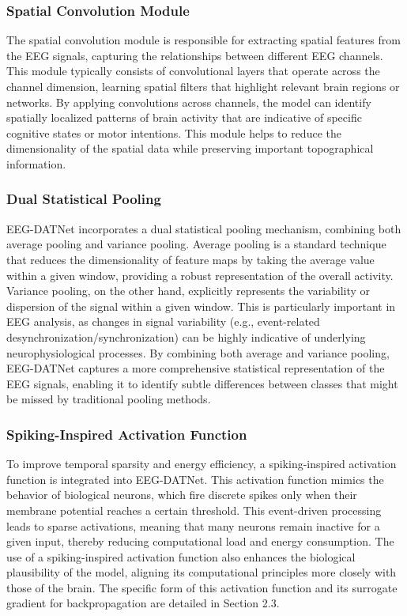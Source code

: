 \documentclass[pdflatex,sn-mathphys-num]{sn-jnl}
\theoremstyle{thmstyleone}%
\theoremstyle{thmstyletwo}%
\theoremstyle{thmstylethree}%
\begin{document}
\subsubsection{Spatial Convolution Module}

The spatial convolution module is responsible for extracting spatial features from the EEG signals, capturing the relationships between different EEG channels. This module typically consists of convolutional layers that operate across the channel dimension, learning spatial filters that highlight relevant brain regions or networks. By applying convolutions across channels, the model can identify spatially localized patterns of brain activity that are indicative of specific cognitive states or motor intentions. This module helps to reduce the dimensionality of the spatial data while preserving important topographical information.

\subsubsection{Dual Statistical Pooling}

EEG-DATNet incorporates a dual statistical pooling mechanism, combining both average pooling and variance pooling. Average pooling is a standard technique that reduces the dimensionality of feature maps by taking the average value within a given window, providing a robust representation of the overall activity. Variance pooling, on the other hand, explicitly represents the variability or dispersion of the signal within a given window. This is particularly important in EEG analysis, as changes in signal variability (e.g., event-related desynchronization/synchronization) can be highly indicative of underlying neurophysiological processes. By combining both average and variance pooling, EEG-DATNet captures a more comprehensive statistical representation of the EEG signals, enabling it to identify subtle differences between classes that might be missed by traditional pooling methods.

\subsubsection{Spiking-Inspired Activation Function}

To improve temporal sparsity and energy efficiency, a spiking-inspired activation function is integrated into EEG-DATNet. This activation function mimics the behavior of biological neurons, which fire discrete spikes only when their membrane potential reaches a certain threshold. This event-driven processing leads to sparse activations, meaning that many neurons remain inactive for a given input, thereby reducing computational load and energy consumption. The use of a spiking-inspired activation function also enhances the biological plausibility of the model, aligning its computational principles more closely with those of the brain. The specific form of this activation function and its surrogate gradient for backpropagation are detailed in Section 2.3.
\end{document}

